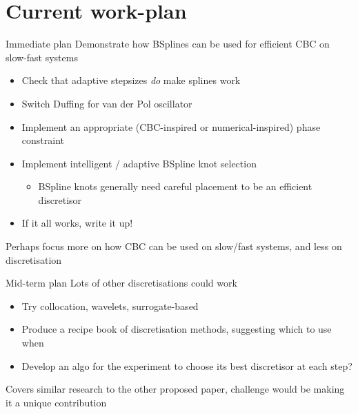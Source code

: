 \documentclass[presentation]{beamer}
\begin{document}
\section{Current work-plan}
\label{sec:org6ec74cb}
\begin{frame}[label={sec:org86bf620}]{Immediate plan}
Demonstrate how BSplines can be used for efficient CBC on slow-fast systems
\vfill
\begin{itemize}
\item Check that adaptive stepsizes \emph{do} make splines work
\item Switch Duffing for van der Pol oscillator
\item Implement an appropriate (CBC-inspired or numerical-inspired) phase constraint
\item Implement intelligent / adaptive BSpline knot selection
\begin{itemize}
\item BSpline knots generally need careful placement to be an efficient discretisor
\end{itemize}
\item If it all works, write it up!
\end{itemize}
\vfill
Perhaps focus more on how CBC can be used on slow/fast systems, and less on discretisation
\end{frame}

\begin{frame}[label={sec:org1ae1ca2}]{Mid-term plan}
Lots of other discretisations could work
\vfill
\begin{itemize}
\item Try collocation, wavelets, surrogate-based
\item Produce a recipe book of discretisation methods, suggesting which to use when
\item Develop an algo for the experiment to choose its best discretisor at each step?
\end{itemize}
\vfill
Covers similar research to the other proposed paper, challenge would be making it a unique contribution
\end{frame}
\end{document}
